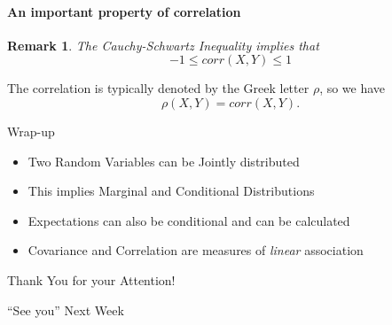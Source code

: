 \documentclass[notes=show,handout]{beamer}\usepackage[]{graphicx}\usepackage[]{color}
\newenvironment{stepitemize}{\begin{itemize}[<+->]}{\end{itemize} }
\newtheorem{remark}{Remark}[section]
\begin{document}
%


\begin{frame}{\secname}%

  \framesubtitle{An important property of correlation}
  \begin{remark}
  The Cauchy-Schwartz Inequality implies that
  \begin{equation*}
  -1\leq corr\left( X,Y\right) \leq 1
  \end{equation*}
  \end{remark}

  \vspace{0.4cm}

  The correlation is typically denoted by the Greek letter $\rho$, so we have
  $$
  \rho(X,Y)= corr\left( X,Y\right).
  $$
\end{frame}

\begin{frame}{Wrap-up}
  \begin{itemize}
  \item Two Random Variables can be Jointly distributed \bigskip
  \item This implies Marginal and Conditional Distributions \bigskip
  \item Expectations can also be conditional and can be calculated \bigskip
  \item Covariance and Correlation are measures of \emph{linear} association\bigskip
  \end{itemize}
\end{frame}

\begin{frame}
  \begin{center}
  \Large{Thank You for your Attention!}

  \bigskip
  \pause

  \Large{``See you'' Next Week}
  \end{center}
\end{frame}
\end{document}
